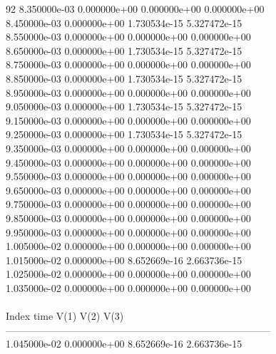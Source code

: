 92	8.350000e-03	0.000000e+00	0.000000e+00	0.000000e+00	\\ 	8.450000e-03	0.000000e+00	1.730534e-15	5.327472e-15	\\ 	8.550000e-03	0.000000e+00	0.000000e+00	0.000000e+00	\\ 	8.650000e-03	0.000000e+00	1.730534e-15	5.327472e-15	\\ 	8.750000e-03	0.000000e+00	0.000000e+00	0.000000e+00	\\ 	8.850000e-03	0.000000e+00	1.730534e-15	5.327472e-15	\\ 	8.950000e-03	0.000000e+00	0.000000e+00	0.000000e+00	\\ 	9.050000e-03	0.000000e+00	1.730534e-15	5.327472e-15	\\ 	9.150000e-03	0.000000e+00	0.000000e+00	0.000000e+00	\\ 	9.250000e-03	0.000000e+00	1.730534e-15	5.327472e-15	\\ 	9.350000e-03	0.000000e+00	0.000000e+00	0.000000e+00	\\ 	9.450000e-03	0.000000e+00	0.000000e+00	0.000000e+00	\\ 	9.550000e-03	0.000000e+00	0.000000e+00	0.000000e+00	\\ 	9.650000e-03	0.000000e+00	0.000000e+00	0.000000e+00	\\ 	9.750000e-03	0.000000e+00	0.000000e+00	0.000000e+00	\\ 	9.850000e-03	0.000000e+00	0.000000e+00	0.000000e+00	\\ 	9.950000e-03	0.000000e+00	0.000000e+00	0.000000e+00	\\ 	1.005000e-02	0.000000e+00	0.000000e+00	0.000000e+00	\\ 	1.015000e-02	0.000000e+00	8.652669e-16	2.663736e-15	\\ 	1.025000e-02	0.000000e+00	0.000000e+00	0.000000e+00	\\ 	1.035000e-02	0.000000e+00	0.000000e+00	0.000000e+00	\\ \hline
\\ \hline
Index   time            V(1)            V(2)            V(3)            \\ \hline
--------------------------------------------------------------------------------\\ 	1.045000e-02	0.000000e+00	8.652669e-16	2.663736e-15	\\ \hline
